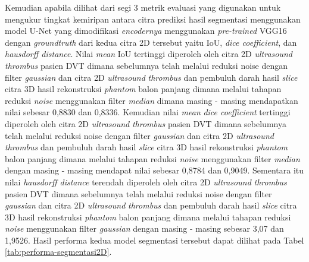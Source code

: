 Kemudian apabila dilihat dari segi 3 metrik evaluasi yang digunakan untuk mengukur tingkat kemiripan antara citra prediksi hasil segmentasi menggunakan model U-Net yang dimodifikasi \textit{encodernya} menggunakan \textit{pre-trained} VGG16 dengan \textit{groundtruth} dari kedua citra 2D tersebut yaitu IoU, \textit{dice coefficient}, dan \textit{hausdorff distance}. Nilai \textit{mean} IoU tertinggi diperoleh oleh citra 2D \textit{ultrasound} \textit{thrombus} pasien DVT dimana sebelumnya telah melalui reduksi noise dengan filter \textit{gaussian} dan citra 2D \textit{ultrasound} \textit{thrombus} dan pembuluh darah hasil \textit{slice} citra 3D hasil rekonstruksi \textit{phantom} balon panjang dimana melalui tahapan reduksi \textit{noise} menggunakan filter \textit{median} dimana masing - masing mendapatkan nilai sebesar 0,8830 dan 0,8336. Kemudian nilai \textit{mean} \textit{dice coefficient} tertinggi diperoleh oleh citra 2D \textit{ultrasound} \textit{thrombus} pasien DVT dimana sebelumnya telah melalui reduksi noise dengan filter \textit{gaussian} dan citra 2D \textit{ultrasound} \textit{thrombus} dan pembuluh darah hasil \textit{slice} citra 3D hasil rekonstruksi \textit{phantom} balon panjang dimana melalui tahapan reduksi \textit{noise} menggunakan filter \textit{median} dengan masing - masing mendapat nilai sebesar 0,8784 dan  0,9049. Sementara itu nilai \textit{hausdorff distance} terendah diperoleh oleh citra 2D \textit{ultrasound} \textit{thrombus} pasien DVT dimana sebelumnya telah melalui reduksi noise dengan filter \textit{gaussian} dan citra 2D \textit{ultrasound} \textit{thrombus} dan pembuluh darah hasil \textit{slice} citra 3D hasil rekonstruksi \textit{phantom} balon panjang dimana melalui tahapan reduksi \textit{noise} menggunakan filter \textit{gaussian} dengan masing - masing sebesar 3,07 dan 1,9526. Hasil performa kedua model segmentasi tersebut dapat dilihat pada Tabel \ref{tab:performa-segmentasi2D}. 


